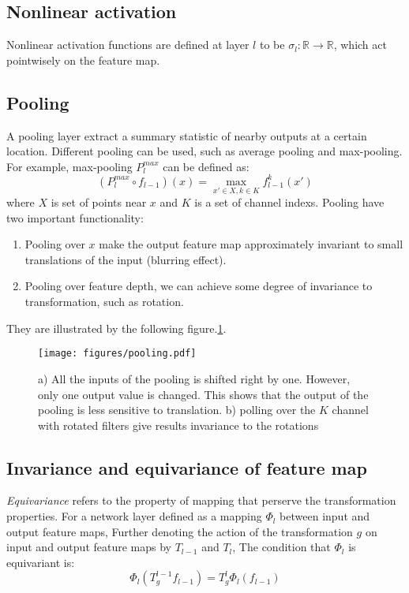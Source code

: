 \documentclass{article}
\begin{document}
\subsection*{Nonlinear activation}
Nonlinear activation functions are defined at layer $l$ to be $\sigma_l:\mathbb{R} \to \mathbb{R}$, which act pointwisely on the feature map.

\subsection*{Pooling}
A pooling layer extract a summary statistic of nearby outputs at a certain location. Different pooling can be 
used, such as average pooling and max-pooling. For example, max-pooling $P^{max}_l$ can be defined as:
\begin{equation}
    (P^{max}_l \circ f_{l-1}) (x) = \max_{x' \in X, k \in K} f_{l-1}^k(x')
\end{equation}
where $X$ is set of points near $x$ and $K$ is a set of channel indexs.
Pooling have two important functionality:
\begin{enumerate}
    \item Pooling over $x$ make the output feature map approximately invariant to small translations of the input (blurring effect).
    \item Pooling over feature depth, we can achieve some degree of invariance to transformation, such as rotation.
\end{enumerate}
They are illustrated 
by the following figure.\ref{F:pooling}.
\begin{figure}[h!]
    \centering
    \texttt{[image: figures/pooling.pdf]}
    \caption{a) All the inputs of the pooling is shifted right by one. However, only one output value is changed. This shows that the output
            of the pooling is less sensitive to translation. 
            b) polling over the $K$ channel with rotated filters give results invariance to the rotations}
    \label{F:pooling}
\end{figure}

\subsection*{Invariance and equivariance of feature map}
\emph{Equivariance} refers to the property of mapping that perserve the transformation properties. 
For a network layer defined as a mapping $\Phi_l$ between input and output feature maps,  
Further denoting the action of the transformation $g$ on input and output feature maps by $T_{l-1}$ and $T_l$,
The condition that $\Phi_l$ is equivariant is:
\begin{equation}
    \Phi_l (T^{l-1}_g f_{l-1}) = T^l_g \Phi_l (f_{l-1}) \label{E:equivariant_condition}
\end{equation}
\end{document}
